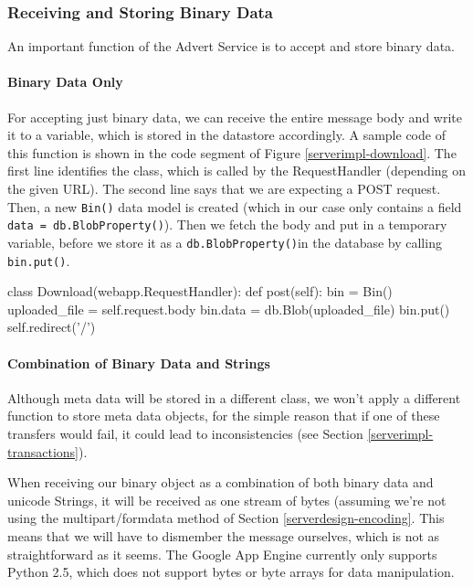 \subsubsection{Receiving and Storing Binary Data}
An important function of the Advert Service is to accept and store binary data.

\paragraph{Binary Data Only}
For accepting just binary data, we can receive the entire message body and write
it to a variable, which is stored in the datastore accordingly. A sample code of
this function is shown in the code segment of Figure \ref{serverimpl-download}.
The first line identifies the class, which is called by the RequestHandler
(depending on the given URL). The second line says that we are expecting a POST
request. Then, a new \texttt{Bin()} data model is created (which in our case only
contains a field \texttt{data = db.BlobProperty()}). Then we fetch the body and
put in a temporary variable, before we store it as a \texttt{db.BlobProperty()}in
the database by calling \texttt{bin.put()}.

\begin{figure*}[ht] %
\begin{center}
\begin{code}
class Download(webapp.RequestHandler):
  def post(self):
    bin = Bin()
    uploaded_file = self.request.body
    bin.data = db.Blob(uploaded_file)
    bin.put()
    self.redirect('/')
\end{code}
\caption{Accepting Binary Data.\label{serverimpl-download}}
\end{center}
\end{figure*}
      
\paragraph{Combination of Binary Data and Strings}
Although meta data will be stored in a different class, we won't apply a
different function to store meta data objects, for the simple reason that if one
of these transfers would fail, it could lead to inconsistencies (see Section
\ref{serverimpl-transactions}).

When receiving our binary object as a combination of both binary data and
unicode Strings, it will be received as one stream of bytes (assuming we're not
using the multipart/formdata method of Section \ref{serverdesign-encoding}.
This means that we will have to dismember the message ourselves, which is
not as straightforward as it seems. The Google App Engine currently only
supports Python 2.5, which does not support bytes or byte arrays for data
manipulation.

